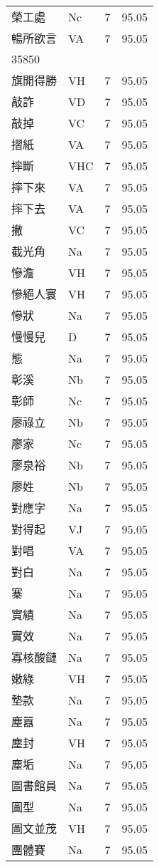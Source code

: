\documentclass[twocolumn]{book}
\begin{document}
\begin{supertabular}{llrr}
榮工處 & Nc & 7 &  95.05\\
暢所欲言 & VA & 7 &  95.05\\
35850\\
旗開得勝 & VH & 7 &  95.05\\
敲詐 & VD & 7 &  95.05\\
敲掉 & VC & 7 &  95.05\\
摺紙 & VA & 7 &  95.05\\
摔斷 & VHC & 7 &  95.05\\
摔下來 & VA & 7 &  95.05\\
摔下去 & VA & 7 &  95.05\\
撇 & VC & 7 &  95.05\\
截光角 & Na & 7 &  95.05\\
慘澹 & VH & 7 &  95.05\\
慘絕人寰 & VH & 7 &  95.05\\
慘狀 & Na & 7 &  95.05\\
慢慢兒 & D & 7 &  95.05\\
態 & Na & 7 &  95.05\\
彰溪 & Nb & 7 &  95.05\\
彰師 & Nc & 7 &  95.05\\
廖祿立 & Nb & 7 &  95.05\\
廖家 & Nc & 7 &  95.05\\
廖泉裕 & Nb & 7 &  95.05\\
廖姓 & Nb & 7 &  95.05\\
對應字 & Na & 7 &  95.05\\
對得起 & VJ & 7 &  95.05\\
對唱 & VA & 7 &  95.05\\
對白 & Na & 7 &  95.05\\
寨 & Na & 7 &  95.05\\
實績 & Na & 7 &  95.05\\
實效 & Na & 7 &  95.05\\
寡核酸鏈 & Na & 7 &  95.05\\
嫩綠 & VH & 7 &  95.05\\
墊款 & Na & 7 &  95.05\\
塵囂 & Na & 7 &  95.05\\
塵封 & VH & 7 &  95.05\\
塵垢 & Na & 7 &  95.05\\
圖書館員 & Na & 7 &  95.05\\
圖型 & Na & 7 &  95.05\\
圖文並茂 & VH & 7 &  95.05\\
團體賽 & Na & 7 &  95.05\\

\end{supertabular}
\end{document}
